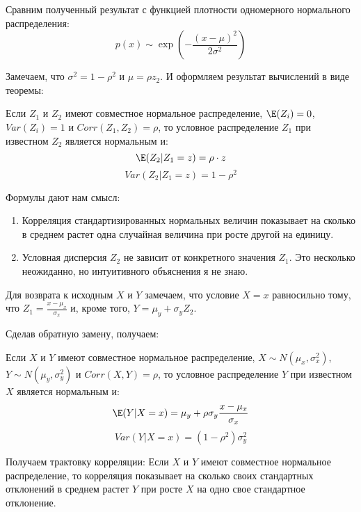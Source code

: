 Сравним полученный результат с функцией плотности одномерного нормального распределения:
\begin{equation}
p(x)\sim\exp\left(-\frac{(x-\mu)^{2}}{2\sigma^{2}}\right)
\end{equation}

Замечаем, что $\sigma^{2}=1-\rho^{2}$ и $\mu=\rho z_{2}$. И оформляем результат вычислений в виде теоремы:
\begin{myth}
Если $Z_{1}$ и $Z_{2}$ имеют совместное нормальное распределение, $\E(Z_{i})=0$, $Var(Z_{i})=1$ и $Corr(Z_{1},Z_{2})=\rho$, то условное распределение $Z_{1}$ при известном $Z_{2}$ является нормальным и:
\begin{equation}
\E(Z_{2}|Z_{1}=z)=\rho\cdot z
\end{equation}
\begin{equation}
Var(Z_{2}|Z_{1}=z)=1-\rho^{2}
\end{equation}
\end{myth}

Формулы дают нам смысл:
\begin{enumerate}
\item Корреляция стандартизированных нормальных величин показывает на сколько в среднем растет одна случайная величина при росте другой на единицу.
\item Условная дисперсия $Z_{2}$ не зависит от конкретного значения $Z_{1}$. Это несколько неожиданно, но интуитивного объяснения я не знаю.
\end{enumerate}
 

Для возврата к исходным $X$ и $Y$ замечаем, что условие $X=x$ равносильно тому, что $Z_{1}=\frac{x-\mu_{x}}{\sigma_{x}}$ и, кроме того, $Y=\mu_{y}+\sigma_{y}Z_{2}$.

Сделав обратную замену, получаем:
\begin{myth}
Если $X$ и $Y$ имеют совместное нормальное распределение, $X\sim N(\mu_{x},\sigma^{2}_{x})$, $Y\sim N(\mu_{y},\sigma^{2}_{y})$ и $Corr(X,Y)=\rho$, то условное распределение $Y$ при известном $X$ является нормальным и:
\begin{equation}
\E(Y|X=x)=\mu_{y}+\rho\sigma_{y}\frac{x-\mu_{x}}{\sigma_{x}}
\end{equation}
\begin{equation}
Var(Y|X=x)=(1-\rho^{2})\sigma_{y}^{2}
\end{equation}
\end{myth}

Получаем трактовку корреляции: Если $X$ и $Y$ имеют совместное нормальное распределение, то корреляция  показывает на сколько своих стандартных отклонений в среднем растет $Y$  при росте $X$ на одно свое стандартное отклонение. 


